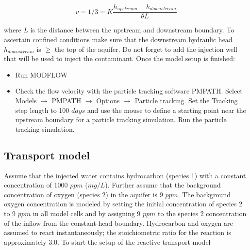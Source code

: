 \begin{equation}
v = 1/3 = K \frac{h_{upstream} -  h_{downstream}} {\theta L}
\end{equation}

where $L$ is the distance between the upstream and downstream boundary. To
ascertain confined conditions make sure that
the downstream hydraulic head $h_{downstream}$ is $\ge$ the top of the aquifer.
Do not forget to add the injection well that will be used to inject the contaminant.
Once the model setup is finished:

\begin{itemize}

\item Run MODFLOW

\item Check the flow velocity with the particle tracking software PMPATH.
Select Models $\rightarrow$ PMPATH $\rightarrow$ Options $\rightarrow$ Particle tracking.
Set the Tracking step length to 100 $days$ and use the mouse to define a starting point
near the upstream boundary for a particle tracking simulation. Run the particle tracking simulation.

\end{itemize}

\subsection{Transport model}

Assume that the injected water contains hydrocarbon (species 1) with 
a constant concentration of 1000 $ppm$ ($mg/L$). Further assume that the background concentration of oxygen (species 2) in
the aquifer is 9 $ppm$. The background oxygen concentration is 
modeled by setting the initial
concentration of species 2 to 9 $ppm$ in all model cells and by 
assigning 9 $ppm$ to the species 2
concentration of the inflow from the constant-head boundary. 
Hydrocarbon and oxygen are
assumed to react instantaneously; 
the stoichiometric ratio for the reaction is approximately 3.0.
To start the setup of the reactive transport model


